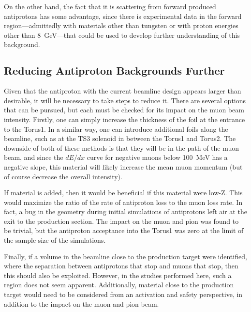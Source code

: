 On the other hand, the fact that it is scattering from forward produced antiprotons has some advantage, since there is experimental data in the forward region---admittedly with materials other than tungsten or with proton energies other than 8~GeV---that could be used to develop further understanding of this background.

\subsection{Reducing Antiproton Backgrounds Further}
Given that the antiproton with the current beamline design appears larger than desirable, it will be necessary to take steps to reduce it.
There are several options that can be pursued, but each must be checked for its impact on the muon beam intensity.
Firstly, one can simply increase the thickness of the foil at the entrance to the Torus1.
In a similar way, one can introduce additional foils along the beamline, such as at the TS3 solenoid in between the Torus1 and Torus2.
The downside of both of these methods is that they will be in the path of the muon beam, and since the $dE/dx$ curve for negative muons below 100~MeV has a negative slope, this material will likely increase the mean muon momentum (but of course decrease the overall intensity).

If material is added, then it would be beneficial if this material were low-Z.  This would maximize the ratio of the rate of antiproton loss to the muon loss rate.
In fact, a bug in the geometry during initial simulations of antiprotons left air at the exit to the production section.  
The impact on the muon and pion was found to be trivial, but the antiproton acceptance into the Torus1 was zero at the limit of the sample size of the simulations.

Finally, if a volume in the beamline close to the production target were identified, where the separation between antiprotons that stop and muons that stop, then this should also be exploited.
However, in the studies performed here, such a region does not seem apparent.
Additionally, material close to the production target would need to be considered from an activation and safety perspective, in addition to the impact on the muon and pion beam.

